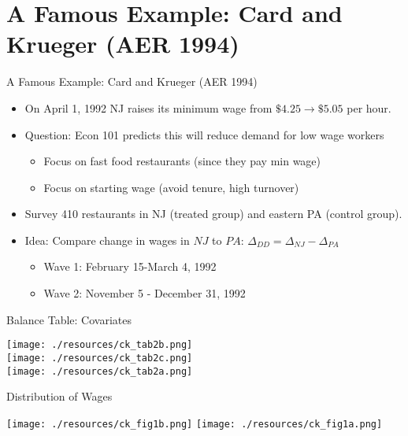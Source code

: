 \section{A Famous Example: Card and Krueger (AER 1994)}

\begin{frame}{A Famous Example: Card and Krueger (AER 1994)}
\begin{itemize}
\item On April 1, 1992 NJ raises its minimum wage from $\$4.25\rightarrow \$5.05$ per hour.
\item Question: Econ 101 predicts this will \alert{reduce demand for low wage workers}
\begin{itemize}
\item Focus on fast food restaurants (since they pay min wage)
\item Focus on starting wage (avoid tenure, high turnover)
\end{itemize}
\item Survey 410 restaurants in NJ (treated group) and eastern PA (control group).
\item Idea: Compare \alert{change} in wages in $NJ$ to $PA$:  $\Delta_{DD} = \Delta_{NJ}- \Delta_{PA}$
\begin{itemize}
\item Wave 1: February 15-March 4, 1992
\item Wave 2: November 5 - December 31, 1992
\end{itemize}
\end{itemize}
\end{frame}

\begin{frame}{Balance Table: Covariates}
\begin{center}
\texttt{[image: ./resources/ck\_tab2b.png]}\\
\texttt{[image: ./resources/ck\_tab2c.png]}\\
\texttt{[image: ./resources/ck\_tab2a.png]}
\end{center}
\end{frame}



\begin{frame}{Distribution of Wages}
\begin{center}
\texttt{[image: ./resources/ck\_fig1b.png]}
\texttt{[image: ./resources/ck\_fig1a.png]}
\end{center}
\end{frame}


